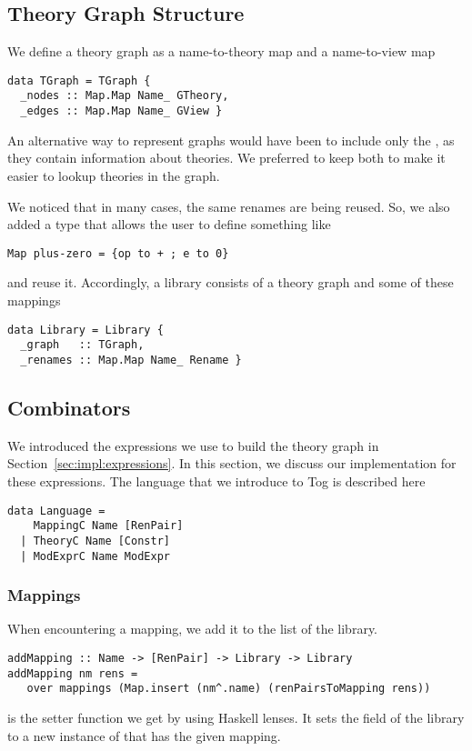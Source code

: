 \subsection{Theory Graph Structure}
We define a theory graph as a name-to-theory map and a name-to-view map 
\begin{verbatim}
data TGraph = TGraph { 
  _nodes :: Map.Map Name_ GTheory,
  _edges :: Map.Map Name_ GView } 
\end{verbatim}
An alternative way to represent graphs would have been to include only the , as they contain information about theories. We preferred to keep both to make it easier to lookup theories in the graph. 

We noticed that in many cases, the same renames are being reused. So, we also added a  type that allows the user to define something like 
\begin{lstlisting}
Map plus-zero = {op to + ; e to 0}
\end{lstlisting}
and reuse it. Accordingly, a library consists of a theory graph and some of these mappings 
\begin{verbatim}
data Library = Library {
  _graph   :: TGraph,
  _renames :: Map.Map Name_ Rename }
\end{verbatim}

\subsection{Combinators}
We introduced the expressions we use to build the theory graph in Section~\ref{sec:impl:expressions}. In this section, we discuss our implementation for these expressions. The language that we introduce to Tog is described here 
\begin{lstlisting}
data Language = 
    MappingC Name [RenPair]
  | TheoryC Name [Constr]
  | ModExprC Name ModExpr
\end{lstlisting}

\subsubsection{Mappings}
When encountering a mapping, we add it to the  list of the library. 
\begin{verbatim}
addMapping :: Name -> [RenPair] -> Library -> Library
addMapping nm rens = 
   over mappings (Map.insert (nm^.name) (renPairsToMapping rens))
\end{verbatim}
 is the setter function we get by using Haskell lenses. It sets the  field of the library to a new instance of  that has the given mapping. 

